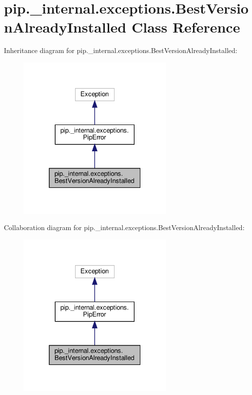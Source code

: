 \hypertarget{classpip_1_1__internal_1_1exceptions_1_1BestVersionAlreadyInstalled}{}\section{pip.\+\_\+internal.\+exceptions.\+Best\+Version\+Already\+Installed Class Reference}
\label{classpip_1_1__internal_1_1exceptions_1_1BestVersionAlreadyInstalled}


Inheritance diagram for pip.\+\_\+internal.\+exceptions.\+Best\+Version\+Already\+Installed\+:
\nopagebreak
\begin{figure}[H]
\begin{center}
\leavevmode
\includegraphics[width=220pt]{classpip_1_1__internal_1_1exceptions_1_1BestVersionAlreadyInstalled__inherit__graph}
\end{center}
\end{figure}


Collaboration diagram for pip.\+\_\+internal.\+exceptions.\+Best\+Version\+Already\+Installed\+:
\nopagebreak
\begin{figure}[H]
\begin{center}
\leavevmode
\includegraphics[width=220pt]{classpip_1_1__internal_1_1exceptions_1_1BestVersionAlreadyInstalled__coll__graph}
\end{center}
\end{figure}


